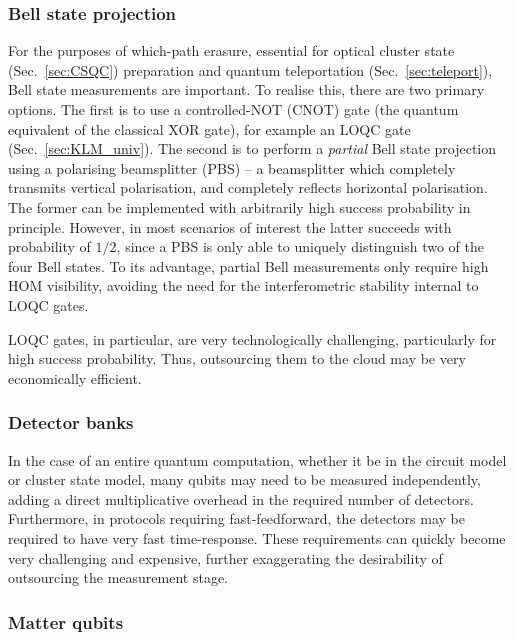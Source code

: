 \documentclass[aps,rmp,twocolumn,amsmath,amssymb,nofootinbib,superscriptaddress]{revtex4}
\begin{document}
%
%

\subsubsection{Bell state projection} \label{sec:bell_proj}

For the purposes of which-path erasure, essential for optical cluster state (Sec.~\ref{sec:CSQC}) preparation and quantum teleportation (Sec.~\ref{sec:teleport}), Bell state measurements are important. To realise this, there are two primary options. The first is to use a controlled-NOT (CNOT) gate (the quantum equivalent of the classical XOR gate), for example an LOQC gate (Sec.~\ref{sec:KLM_univ}). The second is to perform a \emph{partial} Bell state projection using a polarising beamsplitter (PBS) -- a beamsplitter which completely transmits vertical polarisation, and completely reflects horizontal polarisation. The former can be implemented with arbitrarily high success probability in principle. However, in most scenarios of interest the latter succeeds with probability of $1/2$, since a PBS is only able to uniquely distinguish two of the four Bell states. To its advantage, partial Bell measurements only require high HOM visibility, avoiding the need for the interferometric stability internal to LOQC gates.

LOQC gates, in particular, are very technologically challenging, particularly for high success probability. Thus, outsourcing them to the cloud may be very economically efficient.

%
%

\subsubsection{Detector banks}

In the case of an entire quantum computation, whether it be in the circuit model or cluster state model, many qubits may need to be measured independently, adding a direct multiplicative overhead in the required number of detectors. Furthermore, in protocols requiring fast-feedforward, the detectors may be required to have very fast time-response. These requirements can quickly become very challenging and expensive, further exaggerating the desirability of outsourcing the measurement stage.

%
%

\subsubsection{Matter qubits}
\end{document}
